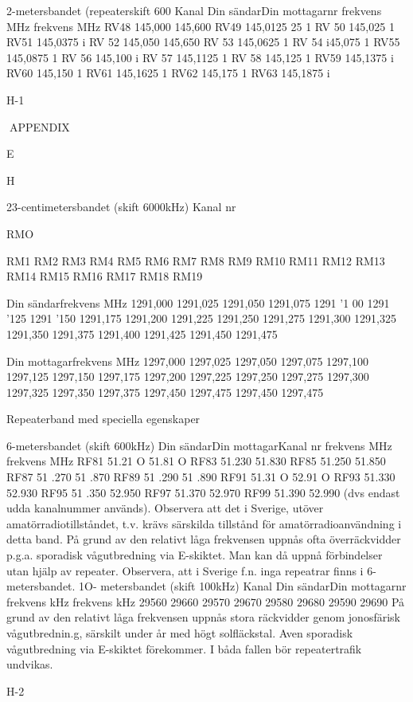 2-metersbandet (repeaterskift 600
Kanal
Din sändarDin mottagarnr
frekvens MHz
frekvens MHz
RV48
145,000
145,600
RV49
145,0125
25
1
RV 50
145,025
1
RV51
145,0375
i
RV 52
145,050
145,650
RV 53
145,0625
1
RV 54
i45,075
1
RV55
145,0875
1
RV 56
145,100
i
RV 57
145,1125
1
RV 58
145,125
1
RV59
145,1375
i
RV60
145,150
1
RV61
145,1625
1
RV62
145,175
1
RV63
145,1875
i

H-1

APPENDIX

E

H

23-centimetersbandet (skift 6000kHz)
Kanal
nr

RMO

RM1
RM2
RM3
RM4
RM5
RM6
RM7
RM8
RM9
RM10
RM11
RM12
RM13
RM14
RM15
RM16
RM17
RM18
RM19

Din sändarfrekvens MHz
1291,000
1291,025
1291,050
1291,075
1291 '1 00
1291 '125
1291 '150
1291,175
1291,200
1291,225
1291,250
1291,275
1291,300
1291,325
1291,350
1291,375
1291,400
1291,425
1291,450
1291,475

Din mottagarfrekvens MHz
1297,000
1297,025
1297,050
1297,075
1297,100
1297,125
1297,150
1297,175
1297,200
1297,225
1297,250
1297,275
1297,300
1297,325
1297,350
1297,375
1297,450
1297,475
1297,450
1297,475

Repeaterband med speciella egenskaper

6-metersbandet (skift 600kHz)
Din sändarDin mottagarKanal
nr
frekvens MHz frekvens MHz
RF81
51.21 O
51.81 O
RF83
51.230
51.830
RF85
51.250
51.850
RF87
51 .270
51 .870
RF89
51 .290
51 .890
RF91
51.31 O
52.91 O
RF93
51.330
52.930
RF95
51 .350
52.950
RF97
51.370
52.970
RF99
51.390
52.990
(dvs endast udda kanalnummer används).
Observera att det i Sverige, utöver amatörradiotillståndet, t.v. krävs särskilda tillstånd
för amatörradioanvändning i detta band.
På grund av den relativt låga frekvensen
uppnås ofta överräckvidder p.g.a. sporadisk
vågutbredning via E-skiktet. Man kan då
uppnå förbindelser utan hjälp av repeater.
Observera, att i Sverige f.n. inga repeatrar
finns i 6-metersbandet.
1O- metersbandet (skift 100kHz)
Kanal
Din sändarDin mottagarnr
frekvens kHz
frekvens kHz
29560
29660
29570
29670
29580
29680
29590
29690
På grund av den relativt låga frekvensen
uppnås stora räckvidder genom jonosfärisk
vågutbrednin.g, särskilt under år med högt
solfläckstal. Aven sporadisk vågutbredning
via E-skiktet förekommer. I båda fallen bör
repeatertrafik undvikas.

H-2
